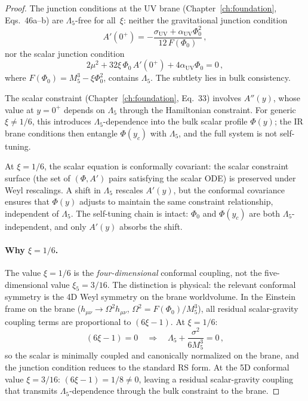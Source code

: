 \begin{proof}
The junction conditions at the UV brane (Chapter~\ref{ch:foundation}, Eqs.~46a--b) are $\Lambda_5$-free for all~$\xi$: neither the gravitational junction condition
\begin{equation}
  A'(0^+) = -\frac{\sigma_{\mathrm{UV}} + \alpha_{\mathrm{UV}}\Phi_0^2}{12\,F(\Phi_0)}\,,
  \label{eq:3-jc-grav}
\end{equation}
nor the scalar junction condition
\begin{equation}
  2\mu^2 + 32\xi\,\Phi_0\,A'(0^+) + 4\alpha_{\mathrm{UV}}\Phi_0 = 0\,,
  \label{eq:3-jc-scalar}
\end{equation}
where $F(\Phi_0) = M_5^3 - \xi\Phi_0^2$, contains $\Lambda_5$. The subtlety lies in bulk consistency.

The scalar constraint (Chapter~\ref{ch:foundation}, Eq.~33) involves $A''(y)$, whose value at $y = 0^+$ depends on $\Lambda_5$ through the Hamiltonian constraint. For generic $\xi \neq 1/6$, this introduces $\Lambda_5$-dependence into the bulk scalar profile $\Phi(y)$; the IR brane conditions then entangle $\Phi(y_c)$ with $\Lambda_5$, and the full system is not self-tuning.

At $\xi = 1/6$, the scalar equation is conformally covariant: the scalar constraint surface (the set of $(\Phi, A')$ pairs satisfying the scalar ODE) is preserved under Weyl rescalings. A shift in $\Lambda_5$ rescales $A'(y)$, but the conformal covariance ensures that $\Phi(y)$ adjusts to maintain the same constraint relationship, independent of $\Lambda_5$. The self-tuning chain is intact: $\Phi_0$ and $\Phi(y_c)$ are both $\Lambda_5$-independent, and only $A'(y)$ absorbs the shift.

\paragraph{Why $\xi = 1/6$.} The value $\xi = 1/6$ is the \emph{four-dimensional} conformal coupling, not the five-dimensional value $\xi_5 = 3/16$. The distinction is physical: the relevant conformal symmetry is the 4D Weyl symmetry on the brane worldvolume. In the Einstein frame on the brane ($h_{\mu\nu} \to \Omega^2 h_{\mu\nu}$, $\Omega^2 = F(\Phi_0)/M_5^3$), all residual scalar-gravity coupling terms are proportional to $(6\xi - 1)$. At $\xi = 1/6$:
\begin{equation}
  (6\xi - 1) = 0 \quad\Longrightarrow\quad \Lambda_5 + \frac{\sigma^2}{6M_5^3} = 0\,,
  \label{eq:3-xi-conformal}
\end{equation}
so the scalar is minimally coupled and canonically normalized on the brane, and the junction condition reduces to the standard RS form. At the 5D conformal value $\xi = 3/16$: $(6\xi - 1) = 1/8 \neq 0$, leaving a residual scalar-gravity coupling that transmits $\Lambda_5$-dependence through the bulk constraint to the brane.


\end{proof}
